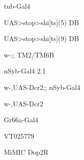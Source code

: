 \documentclass[17pt]{extarticle}
\begin{document}
\footnotesize
\newpage\vspace*{-0.15cm}
\begin{large}
tub-Gal4 \\[0.5em]
\end{large}
\footnotesize
\newpage\vspace*{-0.15cm}
\begin{footnotesize}
UAS>stop>shi[ts](5) DB \\[0.5em]
\end{footnotesize}
\footnotesize
\newpage\vspace*{-0.15cm}
\begin{footnotesize}
UAS>stop>shi[ts](9) DB \\[0.5em]
\end{footnotesize}
\footnotesize
\newpage\vspace*{-0.15cm}
\begin{normalsize}
w-;; TM2/TM6B \\[0.5em]
\end{normalsize}
\footnotesize
\newpage\vspace*{-0.15cm}
\begin{normalsize}
nSyb-Gal4 2.1 \\[0.5em]
\end{normalsize}
\footnotesize
\newpage\vspace*{-0.15cm}
\begin{footnotesize}
w-,UAS-Dcr2;; nSyb-Gal4 \\[0.5em]
\end{footnotesize}
\footnotesize
\newpage\vspace*{-0.15cm}
\begin{normalsize}
w-,UAS-Dcr2 \\[0.5em]
\end{normalsize}
\footnotesize
\newpage\vspace*{-0.15cm}
\begin{large}
Gr66a-Gal4 \\[0.5em]
\end{large}
\footnotesize
\newpage\vspace*{-0.15cm}
\begin{large}
VT025779 \\[0.5em]
\end{large}
\footnotesize
\newpage\vspace*{-0.15cm}
\begin{normalsize}
Mi{MIC} Dop2R \\[0.5em]
\end{normalsize}
\footnotesize
\end{document}
